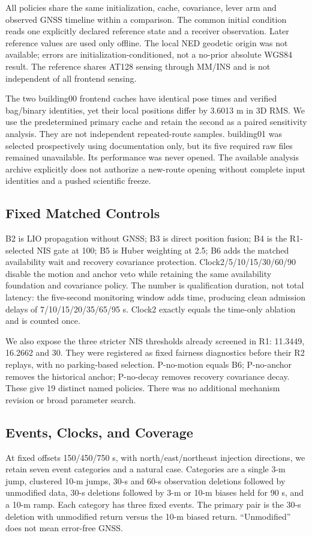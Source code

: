\documentclass[conference]{IEEEtran}
\begin{document}
All policies share the same initialization, cache, covariance, lever arm and observed GNSS timeline within a comparison. The common initial condition reads one explicitly declared reference state and a receiver observation. Later reference values are used only offline. The local NED geodetic origin was not available; errors are initialization-conditioned, not a no-prior absolute WGS84 result. The reference shares AT128 sensing through MM/INS and is not independent of all frontend sensing.

The two building00 frontend caches have identical pose times and verified bag/binary identities, yet their local positions differ by 3.6013 m in 3D RMS. We use the predetermined primary cache and retain the second as a paired sensitivity analysis. They are not independent repeated-route samples. building01 was selected prospectively using documentation only, but its five required raw files remained unavailable. Its performance was never opened. The available analysis archive explicitly does not authorize a new-route opening without complete input identities and a pushed scientific freeze.

\subsection{Fixed Matched Controls}
B2 is LIO propagation without GNSS; B3 is direct position fusion; B4 is the R1-selected NIS gate at 100; B5 is Huber weighting at 2.5; B6 adds the matched availability wait and recovery covariance protection. Clock2/5/10/15/30/60/90 disable the motion and anchor veto while retaining the same availability foundation and covariance policy. The number is qualification duration, not total latency: the five-second monitoring window adds time, producing clean admission delays of 7/10/15/20/35/65/95 s. Clock2 exactly equals the time-only ablation and is counted once.

We also expose the three stricter NIS thresholds already screened in R1: 11.3449, 16.2662 and 30. They were registered as fixed fairness diagnostics before their R2 replays, with no parking-based selection. P-no-motion equals B6; P-no-anchor removes the historical anchor; P-no-decay removes recovery covariance decay. These give 19 distinct named policies. There was no additional mechanism revision or broad parameter search.

\subsection{Events, Clocks, and Coverage}
At fixed offsets 150/450/750 s, with north/east/northeast injection directions, we retain seven event categories and a natural case. Categories are a single 3-m jump, clustered 10-m jumps, 30-s and 60-s observation deletions followed by unmodified data, 30-s deletions followed by 3-m or 10-m biases held for 90 s, and a 10-m ramp. Each category has three fixed events. The primary pair is the 30-s deletion with unmodified return versus the 10-m biased return. ``Unmodified'' does not mean error-free GNSS.
\end{document}
